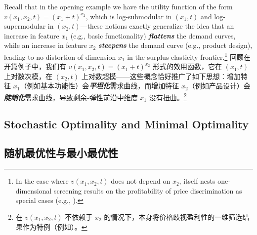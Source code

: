\documentclass[12pt,letterpaper]{article}
\newenvironment{original}{\color{black}\noindent}{}
\newenvironment{translation}{\color{blue}\noindent}{}
\theoremstyle{plain}
\theoremstyle{definition}
\theoremstyle{remark}
\renewcommand{\1}{\mathds{1}}
\theoremstyle{definition}
\begin{document}
\begin{original}
Recall that in the opening example we have the utility function of the form $v(x_1, x_2, t) = (x_1 + t)^{x_2}$, which is log-submodular in $(x_1, t)$ and log-supermodular in $(x_2, t)$---these notions exactly generalize the idea that an increase in feature $x_1$ (e.g., basic functionality) \textit{\textbf{flattens}} the demand curves, while an increase in feature $x_2$ \textit{\textbf{steepens}} the demand curve (e.g., product design), leading to no distortion of dimension $x_1$ in the surplus-elasticity frontier.\footnote{In the case where $v(x_1, x_2, t)$ does not depend on $x_2$,  itself nests one-dimensional screening results on the profitability of price discrimination as special cases (e.g., \citealt{johnson2003multiproduct,anderson2009price}).}
\end{original}
\begin{translation}
回顾在开篇例子中，我们有 $v(x_1, x_2, t) = (x_1 + t)^{x_2}$ 形式的效用函数，它在 $(x_1, t)$ 上对数次模，在 $(x_2, t)$ 上对数超模——这些概念恰好推广了如下思想：增加特征 $x_1$（例如基本功能性）会\textit{\textbf{平坦化}}需求曲线，而增加特征 $x_2$（例如产品设计）会\textit{\textbf{陡峭化}}需求曲线，导致剩余-弹性前沿中维度 $x_1$ 没有扭曲。\footnote{在 $v(x_1, x_2, t)$ 不依赖于 $x_2$ 的情况下，本身将价格歧视盈利性的一维筛选结果作为特例（例如\citealt{johnson2003multiproduct,anderson2009price}）。}
\end{translation}

\begin{original}
\subsection{Stochastic Optimality and Minimal Optimality}
\end{original}
\begin{translation}
\subsection{随机最优性与最小最优性}
\end{translation}
\end{document}
